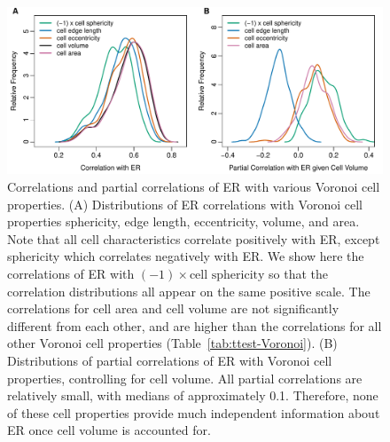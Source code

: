 \documentclass[12pt]{article}
\begin{document}
    \begin{figure}
        \begin{center}
        \includegraphics[width=6.5in]{best_voronoi_predictors_of_ER_screen_V.pdf}
        \end{center}
        \caption{Correlations and partial correlations of ER with various Voronoi cell properties. (A) Distributions of ER correlations with Voronoi cell properties sphericity, edge length, eccentricity, volume, and area. Note that all cell characteristics correlate positively with ER, except sphericity which correlates negatively with ER. We show here the correlations of ER with $(-1)\times \text{cell sphericity}$ so that the correlation distributions all appear on the same positive scale. The correlations for cell area and cell volume are not significantly different from each other, and are higher than the correlations for all other Voronoi cell properties (Table~\ref{tab:ttest-Voronoi}). (B) Distributions of partial correlations of ER with Voronoi cell properties, controlling for cell volume. All partial correlations are relatively small, with medians of approximately 0.1. Therefore, none of these cell properties provide much independent information about ER once cell volume is accounted for.}
        \label{fig:voronoi_ER_screen}
    \end{figure}
\end{document}
